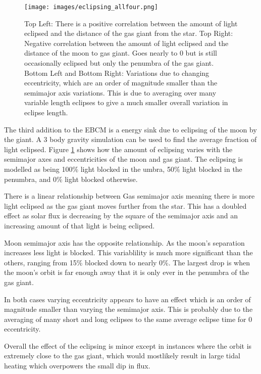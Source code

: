 \documentclass[12pt, onecolumn]{revtex4-2}    %
\begin{document}
\begin{figure}
    \texttt{[image: images/eclipsing\_allfour.png]}
    \caption{
        Top Left: There is a positive correlation between the amount of light eclipsed and the distance of the gas giant from the star.
        Top Right: Negative correlation between the amount of light eclipsed and the distance of the moon to gas giant.
        Goes nearly to 0 but is still occasionally eclipsed but only the penumbra of the gas giant.
        Bottom Left and Bottom Right: Variations due to changing eccentricity, which are an order of magnitude smaller than the semimajor axis variations.
        This is due to averaging over many variable length eclipses to give a much smaller overall variation in eclipse length.
    }
    \label{fig:eclipsing}
\end{figure}

The third addition to the EBCM is a energy sink due to eclipsing of the moon by the giant.
A 3 body gravity simulation can be used to find the average fraction of light eclipsed.
Figure \ref{fig:eclipsing} shows how the amount of eclipsing varies with the semimajor axes and eccentricities of the moon and gas giant.
The eclipsing is modelled as being 100\% light blocked in the umbra, 50\% light blocked in the penumbra, and 0\% light blocked otherwise.

There is a linear relationship between Gas semimajor axis meaning there is more light eclipsed as the gas giant moves further from the star.
This has a doubled effect as solar flux is decreasing by the square of the semimajor axis and an increasing amount of that light is being eclipsed.

Moon semimajor axis has the opposite relationship.
As the moon's separation increases less light is blocked.
This variablility is much more significant than the others, ranging from 15\% blocked down to nearly 0\%.
The largest drop is when the moon's orbit is far enough away that it is only ever in the penumbra of the gas giant.

In both cases varying eccentricity appears to have an effect which is an order of magnitude smaller than varying the semimajor axis.
This is probably due to the averaging of many short and long eclipses to the same average eclipse time for 0 eccentricity.

Overall the effect of the eclipsing is minor except in instances where the orbit is extremely close to the gas giant, which would mostlikely result in large tidal heating which overpowers the small dip in flux.
\end{document}
